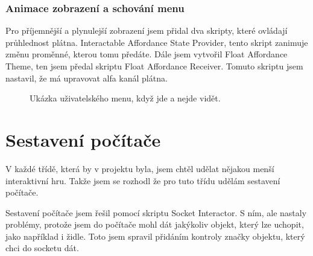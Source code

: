 \documentclass[12pt, a4paper,
twoside,        %
openright
]{report}
\begin{document}
\subsubsection{Animace zobrazení a schování menu}
Pro příjemnější a plynulejší zobrazení jsem přidal dva skripty, které ovládají průhlednost plátna. Interactable Affordance State Provider, tento skript zanimuje změnu proměnné, kterou tomu předáte. Dále jsem vytvořil Float Affordance Theme, ten jsem předal skriptu Float Affordance Receiver. Tomuto skriptu jsem nastavil, že má upravovat alfa kanál plátna.

\begin{figure}[h!]
	\centering
	\qquad
	\caption{Ukázka uživatelského menu, když jde a nejde vidět.}
	\label{fig:uzivatelske_menu}
\end{figure}

\newpage

\section{Sestavení počítače}
\label{sec:sestaveni_pocitace}
V každé třídě, která by v projektu byla, jsem chtěl udělat nějakou menší interaktivní hru. Takže jsem se rozhodl že pro tuto třídu udělám sestavení počítače.

Sestavení počítače jsem řešil pomocí skriptu Socket Interactor. S ním, ale nastaly problémy, protože jsem do počítače mohl dát jakýkoliv objekt, který lze uchopit, jako například i židle. Toto jsem spravil přidáním kontroly značky objektu, který chci do socketu dát.
\end{document}
